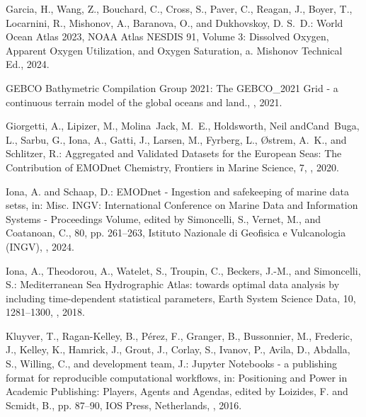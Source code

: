 \documentclass[essd,manuscript]{copernicus}
\begin{document}
\begin{thebibliography}{52}
Garcia, H., Wang, Z., Bouchard, C., Cross, S., Paver, C., Reagan, J., Boyer,
  T., Locarnini, R., Mishonov, A., Baranova, O., and Dukhovskoy, D. S.~D.:
  {World Ocean Atlas 2023}, NOAA Atlas NESDIS 91, Volume 3: Dissolved Oxygen,
  Apparent Oxygen Utilization, and Oxygen Saturation, a. Mishonov Technical
  Ed., 2024{}.

{GEBCO Bathymetric Compilation Group 2021}: The GEBCO\_2021 Grid - a continuous
  terrain model of the global oceans and land.,
  , 2021.

Giorgetti, A., Lipizer, M., Molina~Jack, M.~E., Holdsworth, Neil andCand~Buga,
  L., Sarbu, G., Iona, A., Gatti, J., Larsen, M., Fyrberg, L., Østrem, A.~K.,
  and Schlitzer, R.: {Aggregated and Validated Datasets for the European Seas:
  The Contribution of EMODnet Chemistry}, Frontiers in Marine Science, 7,
  , 2020.

Iona, A. and Schaap, D.: {EMODnet - Ingestion and safekeeping of marine data
  setss}, in: {Misc. INGV: International Conference on Marine Data and
  Information Systems - Proceedings Volume}, edited by Simoncelli, S., Vernet,
  M., and Coatanoan, C., 80, pp. 261--263, Istituto Nazionale di Geofisica e
  Vulcanologia (INGV), , 2024.

Iona, A., Theodorou, A., Watelet, S., Troupin, C., Beckers, J.-M., and
  Simoncelli, S.: Mediterranean Sea Hydrographic Atlas: towards optimal data
  analysis by including time-dependent statistical parameters, Earth System
  Science Data, 10, 1281–1300, , 2018.

Kluyver, T., Ragan-Kelley, B., P{\'e}rez, F., Granger, B., Bussonnier, M.,
  Frederic, J., Kelley, K., Hamrick, J., Grout, J., Corlay, S., Ivanov, P.,
  Avila, D., Abdalla, S., Willing, C., and development team, J.: Jupyter
  Notebooks - a publishing format for reproducible computational workflows, in:
  Positioning and Power in Academic Publishing: Players, Agents and Agendas,
  edited by Loizides, F. and Scmidt, B., pp. 87--90, IOS Press, Netherlands,
  , 2016.


\end{thebibliography}
\end{document}
